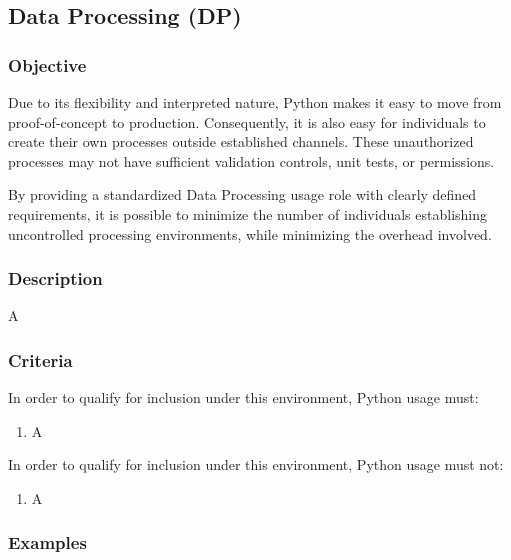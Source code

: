 
	\subsection{Data Processing (DP)}

		\subsubsection{Objective}

			Due to its flexibility and interpreted nature, Python makes it easy to move from proof-of-concept to production. Consequently, it is also easy for individuals to create their own processes outside established channels. These unauthorized processes may not have sufficient validation controls, unit tests, or permissions.

			By providing a standardized Data Processing usage role with clearly defined requirements, it is possible to minimize the number of individuals establishing uncontrolled processing environments, while minimizing the overhead involved.

		\subsubsection{Description}

			A

		\subsubsection{Criteria}

			In order to qualify for inclusion under this environment, Python usage must:

			\begin{enumerate}
        		\item A
        	\end{enumerate}

			In order to qualify for inclusion under this environment, Python usage must not:

			\begin{enumerate}
        		\item A
        	\end{enumerate}

		\subsubsection{Examples}

